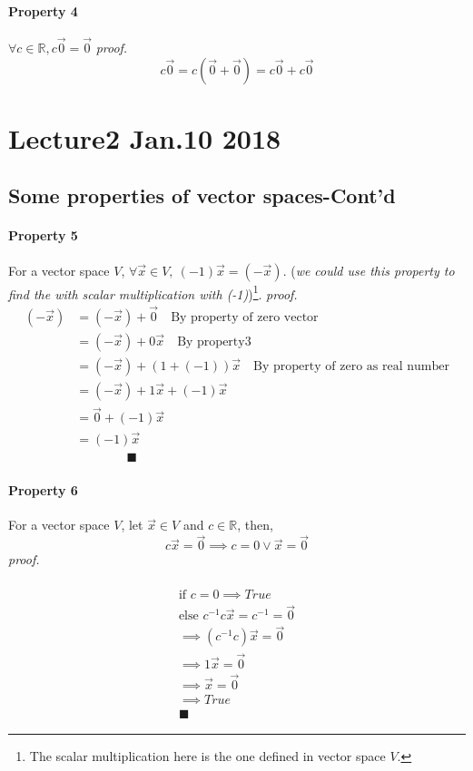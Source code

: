 \documentclass[11pt]{article}
\begin{document}
    \paragraph{Property 4} $\forall c \in \mathbb{R}, c \vec{0} = \vec{0}$
    \newline
    \emph{proof.}
    \[
    c \vec{0} = c(\vec{0} + \vec{0}) = c\vec{0} + c\vec{0}
    \]
    \section{Lecture2 Jan.10 2018}
    \subsection{Some properties of vector spaces-Cont'd}
    \paragraph{Property 5} For a vector space $V$, $\forall \vec{x} \in V,\ (-1)\vec{x} = (-\vec{x})$. (\emph{we could use this property to find the  with scalar multiplication with (-1)})\footnote{The scalar multiplication here is the one defined in vector space $V$.}.
    \newline
    \emph{proof.}
    \begin{align*}
    (-\vec{x}) &= (-\vec{x}) + \vec{0} \quad \text{By property of zero vector}\\
    &= (-\vec{x}) + 0\vec{x} \quad \text{By property3}\\
    &= (-\vec{x}) + (1 + (-1))\vec{x} \quad \text{By property of zero as real number} \\
    &= (-\vec{x}) + 1\vec{x} + (-1)\vec{x} \\
    &= \vec{0} + (-1)\vec{x} \\
    &= (-1)\vec{x} \\
    &\qquad \qquad \blacksquare	
    \end{align*}

	\paragraph{Property 6} For a vector space $V$, let $\vec{x} \in V$ and $c \in \mathbb{R}$, then,
	\[
	c\vec{x} = \vec{0} \implies c = 0 \lor \vec{x} = \vec{0}
	\]
	\newline
	\emph{proof.}
	
	\begin{multline*}
		\\
		\text{if } c = 0 \implies True \\
		\text{else } c^{-1}c\vec{x} = c^{-1} = \vec{0} \\
		\implies (c^{-1}c)\vec{x}  = \vec{0} \\
		\implies 1\vec{x} = \vec{0} \\
		\implies \vec{x} = \vec{0} \\
		\implies True \\
		\blacksquare
	\end{multline*}
	
\end{document}
